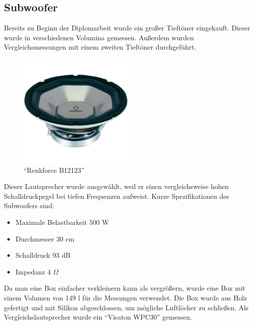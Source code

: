 \subsection{Subwoofer} \label{subsec:5.3.3}
Bereits zu Beginn der Diplomarbeit wurde ein großer Tieftöner eingekauft. Dieser wurde in verschiedenen Volumina gemessen. Außerdem wurden Vergleichsmessungen mit einem zweiten Tieftöner durchgeführt.
\begin{figure} [H]
	\centering
	\includegraphics[width=0.5\textwidth]{img/LSMessung/TT/renkforce_B12123.png}
	\caption[\enquote{Renkforce B12123}]{\enquote{Renkforce B12123}\footnotemark}
	\label{fig:5.3.3.1}
\end{figure}
Dieser Lautsprecher wurde ausgewählt, weil er einen vergleichsweise hohen Schalldruckpegel bei tiefen Frequenzen aufweist. Kurze Spezifikationen des Subwoofers sind:
\begin{itemize}
	\item Maximale Belastbarkeit 500 W
	\item Durchmesser 30 cm
	\item Schalldruck 93 dB
	\item Impedanz 4 $\Omega$
\end{itemize}
Da man eine Box einfacher verkleinern kann als vergrößern, wurde eine Box mit einem Volumen von 149 l für die Messungen verwendet. Die Box wurde aus Holz gefertigt und mit Silikon abgeschlossen, um mögliche Luftlöcher zu schließen. Als Vergleichslautsprecher wurde ein \enquote{Visaton WPC30} gemessen.

